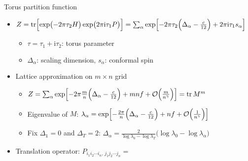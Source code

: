 \documentclass{fdubeamer}
\newcommand{\tikzinput}[1]{}
\newcommand{\ii}{\mathrm{i}}
\newcommand{\1}{\mathbb{1}}
\DeclareMathOperator{\tr}{tr}
\begin{document}
\begin{frame}{Torus partition function}

\linespread{1.4}
\selectfont

\begin{itemize}
  \item $
      Z = \tr \Bigl[ \exp \bigl( -2\pi\tau_2 H \bigr) \exp \bigl( 2\pi\ii\tau_1 P \bigr) \Bigr]
        = \sum_\alpha \exp \Bigl[ - 2\pi \tau_2 \Bigl(\Delta_\alpha - \frac{c}{12} \Bigr) + 2\pi\ii\tau_1 s_\alpha \Bigr]
    $

    \begin{itemize}
      \item $\tau=\tau_1+\ii\tau_2$: torus parameter
      \item $\Delta_\alpha$: scaling dimension, $s_\alpha$: conformal spin
    \end{itemize}

  \item Lattice approximation on $m\times n$ grid

    \begin{itemize}
      \item $
          Z = \sum_\alpha \exp \Bigl[
                - 2\pi \frac mn \Bigl(\Delta_\alpha - \frac{c}{12} \Bigr)
                + mnf + \mathcal{O} \Bigl( \frac{m}{n^\gamma} \Bigr)
              \Bigr]
            = \tr M^m
        $
      \item Eigenvalue of $M$: $
              \lambda_\alpha = \exp \Bigl[
            - \frac{2\pi}{n} \Bigl(\Delta_\alpha - \frac{c}{12} \Bigr)
            + nf + \mathcal{O} \Bigl( \frac{1}{n^\gamma} \Bigr)
          \Bigr]
        $
      \item Fix $\Delta_{\1}=0$ and $\Delta_T=2$:
        $\Delta_\alpha = \frac{2}{\log\lambda_0 - \log\lambda_T} \bigl( \log\lambda_0 - \log \lambda_\alpha \bigr)$
    \end{itemize}

  \item Translation operator:
    \begingroup
      \tikzset{x=1em, y=1em, node font=\tiny}
      $P_{i_1 i_2 \cdots i_n, \, j_1 j_2 \cdots j_n} = \tikzinput{translation-operator}$
    \endgroup
\end{itemize}

\end{frame}
\end{document}
